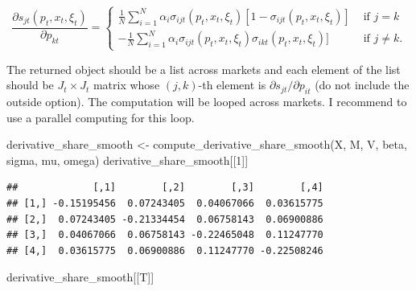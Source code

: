 \documentclass[
]{book}
\newenvironment{Shaded}{\begin{snugshade}}{\end{snugshade}}
\newcommand{\DecValTok}[1]{\textcolor[rgb]{0.00,0.00,0.81}{#1}}
\newcommand{\FunctionTok}[1]{\textcolor[rgb]{0.00,0.00,0.00}{#1}}
\newcommand{\NormalTok}[1]{#1}
\newcommand{\OtherTok}[1]{\textcolor[rgb]{0.56,0.35,0.01}{#1}}
\begin{document}
\[
\frac{\partial s_{jt}(p_t, x_t, \xi_t)}{\partial p_{kt}} = 
\begin{cases}
\frac{1}{N} \sum_{i = 1}^N \alpha_i \sigma_{ijt}(p_t, x_t, \xi_t)[1 - \sigma_{ijt}(p_t, x_t, \xi_t)] &\text{   if   } j = k\\
- \frac{1}{N}\sum_{i = 1}^N \alpha_i \sigma_{ijt}(p_t, x_t, \xi_t)\sigma_{ikt}(p_t, x_t, \xi_t)] &\text{   if   } j \neq k.
\end{cases}
\]

The returned object should be a list across markets and each element of the list should be \(J_t \times J_t\) matrix whose \((j, k)\)-th element is \(\partial s_{jt}/\partial p_{it}\) (do not include the outside option). The computation will be looped across markets. I recommend to use a parallel computing for this loop.

\begin{Shaded}
\begin{Highlighting}[]
\NormalTok{derivative\_share\_smooth }\OtherTok{\textless{}{-}}
  \FunctionTok{compute\_derivative\_share\_smooth}\NormalTok{(X, M, V, beta, sigma, mu, omega)}
\NormalTok{derivative\_share\_smooth[[}\DecValTok{1}\NormalTok{]]}
\end{Highlighting}
\end{Shaded}

\begin{verbatim}
##             [,1]        [,2]        [,3]        [,4]
## [1,] -0.15195456  0.07243405  0.04067066  0.03615775
## [2,]  0.07243405 -0.21334454  0.06758143  0.06900886
## [3,]  0.04067066  0.06758143 -0.22465048  0.11247770
## [4,]  0.03615775  0.06900886  0.11247770 -0.22508246
\end{verbatim}

\begin{Shaded}
\begin{Highlighting}[]
\NormalTok{derivative\_share\_smooth[[T]]}
\end{Highlighting}
\end{Shaded}
\end{document}
